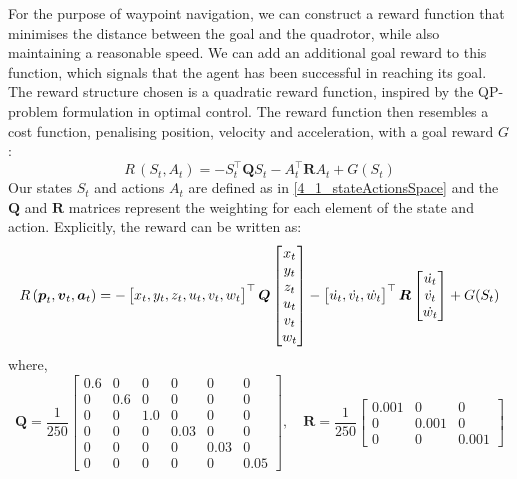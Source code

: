 For the purpose of waypoint navigation, we can construct a reward function that minimises the distance between the goal and the quadrotor, while  also maintaining a reasonable speed. We can add an additional goal reward to this function, which signals that the agent has been successful in reaching its goal.
The reward structure chosen is a quadratic reward function, inspired by the QP-problem formulation in optimal control. The reward function then resembles a cost function, penalising position, velocity and acceleration, with a goal reward $G$:
\begin{equation}
    R \, (S_t, A_t) = - S_t^\top \boldsymbol{Q} S_t -  A_t^\top \boldsymbol{R}  A_t  + G(S_t)
    \label{4_rewardFunction}
\end{equation}
Our states $S_t$ and actions $A_t$ are defined as in \eqref{4_1_stateActionsSpace} and the $\boldsymbol{Q}$ and $\boldsymbol{R}$ matrices represent the weighting for each element of the state and action. Explicitly, the reward can be written as:
\begin{equation}
R \, ({\boldsymbol{p}}_t, {\boldsymbol{v}}_t, {\boldsymbol{a}}_t) = - 
    \begin{bmatrix}
    x_t, y_t, z_t, 
    u_t, v_t, w_t
    \end{bmatrix}^\top
    \boldsymbol{Q}
    \begin{bmatrix}
    x_t\\
    y_t\\
    z_t\\
    u_t\\
    v_t\\
    w_t
    \end{bmatrix}
    -
    \begin{bmatrix}
    \Dot{u_t}, \Dot{v_t}, \Dot{w_t}
    \end{bmatrix}^\top
    \boldsymbol{R}
    \begin{bmatrix}
    \Dot{u_t}\\
    \Dot{v_t}\\
    \Dot{w_t}
    \end{bmatrix}
    + G(S_t)
\end{equation}
where,
\begin{equation}
    \boldsymbol{Q} = \frac{1}{250}
    \begin{bmatrix}
    0.6 & 0 & 0 & 0 & 0 & 0 \\
    0 & 0.6 & 0 & 0 & 0 & 0 \\
    0 & 0 & 1.0 & 0 & 0 & 0 \\
    0 & 0 & 0 & 0.03 & 0 & 0 \\
    0 & 0 & 0 & 0 & 0.03 & 0 \\
    0 & 0 & 0 & 0 & 0 & 0.05 
    \end{bmatrix}, \quad
    \boldsymbol{R} = \frac{1}{250}
    \begin{bmatrix}
    0.001 & 0 & 0 \\
    0 & 0.001 & 0 \\
    0 & 0 & 0.001
    \end{bmatrix}
    \label{4_QR_rewardWeights}
\end{equation}
